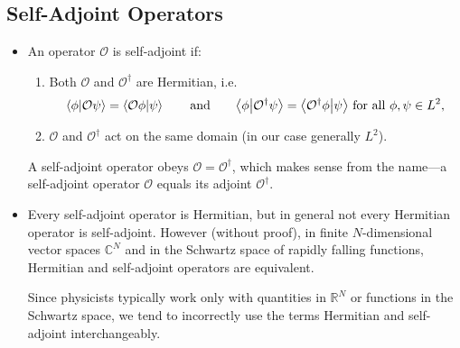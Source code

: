 \documentclass[11pt, a4paper]{article}
\newcommand{\eqtext}[1]{\qquad \text{#1} \qquad}
\newcommand{\Herm}{Hermitian\xspace}
\renewcommand{\O}{\mathcal{O}}  %
\newcommand{\p}{\psi}  %
\newcommand{\bbraket}[2]{\big \langle {#1} \big | {#2} \big \rangle}  %
\begin{document}
\subsection{Self-Adjoint Operators}
\begin{itemize}
	\item An operator $ \O $ is self-adjoint if:
	\begin{enumerate}
		\item Both $ \O $ and $ \O^{\dagger} $ are Hermitian, i.e.
		\begin{equation*}
			\braket{\phi}{\O \p} = \braket{\O\phi}{\p} \eqtext{and} \bbraket{\phi}{\O^{\dagger} \p} = \bbraket{\O^{\dagger}\phi}{\p} \ \text{for all } \phi, \p \in L^{2},
		\end{equation*}
		
		\item $ \O $ and $ \O^{\dagger} $ act on the same domain (in our case generally $ L^{2} $).
	\end{enumerate} 
	A self-adjoint operator obeys $ \O = \O^{\dagger} $, which makes sense from the name---a self-adjoint operator $ \O $ equals its adjoint $ \O^{\dagger} $.
	
	\item Every self-adjoint operator is \Herm, but in general not every \Herm operator is self-adjoint. However (without proof), in finite $ N $-dimensional vector spaces $ \mathbb{C}^{N} $ and in the Schwartz space of rapidly falling functions, \Herm and self-adjoint operators are equivalent. 
	
	Since physicists typically work only with quantities in $ \mathbb{R}^{N} $ or functions in the Schwartz space, we tend to incorrectly use the terms Hermitian and self-adjoint interchangeably.

\end{itemize}
\end{document}
